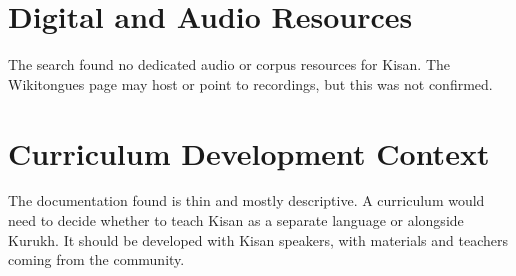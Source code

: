 \documentclass[12pt]{article}
\begin{document}
\section{Digital and Audio Resources}
The search found no dedicated audio or corpus resources for Kisan. The Wikitongues page may host or point to recordings, but this was not confirmed.

\section{Curriculum Development Context}
The documentation found is thin and mostly descriptive. A curriculum would need to decide whether to teach Kisan as a separate language or alongside Kurukh. It should be developed with Kisan speakers, with materials and teachers coming from the community.
\end{document}
